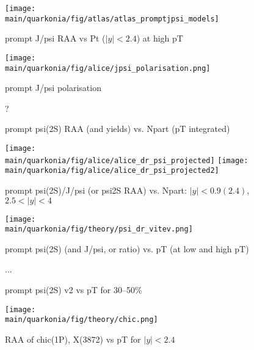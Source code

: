 \documentclass[../report.tex]{subfiles}
\providecommand{\main}{..}
\begin{document}
\begin{figure}
\begin{center}
 \texttt{[image: \\main/quarkonia/fig/atlas/atlas\_promptjpsi\_models]}
\end{center}

 \caption{prompt J/psi RAA vs Pt ($|y|<2.4$) at high pT~\cite{Aaboud:2018quy}}
\end{figure}

\begin{figure}
\begin{center}
\texttt{[image: \\main/quarkonia/fig/alice/jpsi\_polarisation.png]}
\end{center}

 \caption{prompt J/psi polarisation~\cite{Abelev:1475243}}
\end{figure}

\begin{figure}
\begin{center}
 ?
\end{center}

 \caption{prompt psi(2S) RAA (and yields) vs. Npart (pT integrated) }
\end{figure}

\begin{figure}
\begin{center}
 \texttt{[image: \\main/quarkonia/fig/alice/alice\_dr\_psi\_projected]}
 \texttt{[image: \\main/quarkonia/fig/alice/alice\_dr\_psi\_projected2]}
\end{center}

 \caption{prompt psi(2S)/J/psi (or psi2S RAA) vs. Npart: $|y|<0.9 (2.4)$, $2.5<|y|<4$}
\end{figure}

\begin{figure}
\begin{center}
 \texttt{[image: \\main/quarkonia/fig/theory/psi\_dr\_vitev.png]}
\end{center}

 \caption{prompt psi(2S) (and J/psi, or ratio) vs. pT (at low and high pT) }
\end{figure}

\begin{figure}
...

 \caption{prompt psi(2S) v2 vs pT for 30--50\%}
\end{figure}

\begin{figure}
\begin{center}
 \texttt{[image: \\main/quarkonia/fig/theory/chic.png]}
\end{center}

 \caption{RAA of chic(1P), X(3872) vs pT for $|y|<2.4$}
\end{figure}
\end{document}
